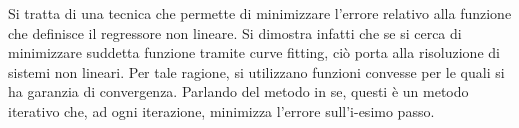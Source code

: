 \documentclass{subfiles}
\begin{document}
Si tratta di una tecnica che permette di minimizzare l'errore relativo alla funzione che definisce il regressore non lineare.
Si dimostra infatti che se si cerca di minimizzare suddetta funzione tramite curve fitting, ciò porta alla risoluzione di sistemi non lineari.
Per tale ragione, si utilizzano funzioni convesse per le quali si ha garanzia di convergenza.
Parlando del metodo in se, questi è un metodo iterativo che, ad ogni iterazione, minimizza l'errore sull'i-esimo passo.
\end{document}
